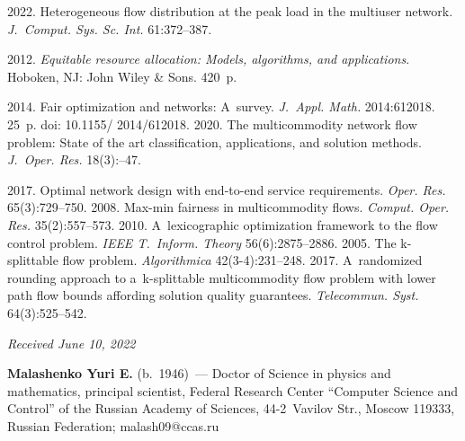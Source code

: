   \begin{multicols}{2}

\renewcommand{\bibname}{\protect\rmfamily References}

{\small\frenchspacing
 {%
 \begin{thebibliography}{9}
2022. Heterogeneous flow distribution at the peak load in the multiuser network. \textit{J.~Comput. Sys. Sc. Int.} 61:372--387.

 2012. \textit{Equitable resource allocation: Models, algorithms, and applications}.
Hoboken, NJ: John Wiley \& Sons. 420~p.

 2014. Fair optimization and networks: A~survey. \textit{J.~Appl. Math.} 2014:612018. 25~p. doi: 10.1155/ 2014/612018.
 2020. The multicommodity network flow problem: State of the art classification, applications, and solution methods. 
 \textit{J.~Oper. Res.} 18(3):--47.

 2017. Optimal network design with end-to-end service requirements. 
\textit{Oper. Res.} 65(3):729--750.
 2008. Max-min fairness in multicommodity flows. 
\textit{Comput. Oper. Res.} 35(2):557--573.
 2010. A~lexicographic optimization framework to the flow control problem. 
\textit{IEEE T.~Inform. Theory} 56(6):2875--2886.
 2005. The k-splittable flow problem. \textit{Algorithmica} 42(3-4):231--248.
 2017. A~randomized rounding approach to a~\mbox{k-splittable} multicommodity flow problem with lower path flow bounds affording solution quality guarantees. 
\textit{Telecommun. Syst.} 64(3):525--542.
 \end{thebibliography}

 }
 }

\end{multicols}

\vspace*{-6pt}

\hfill{\small\textit{Received June 10, 2022}}

\Contrl

\noindent
\textbf{Malashenko Yuri E.} (b.\ 1946)~--- 
Doctor of Science in physics and mathematics, principal scientist, Federal Research Center ``Computer Science and Control'' 
of the Russian Academy of Sciences, 44-2~Vavilov Str., Moscow 119333, Russian Federation; \mbox{malash09@ccas.ru} 


\label{end\stat}

\renewcommand{\bibname}{\protect\rm Литература}  
